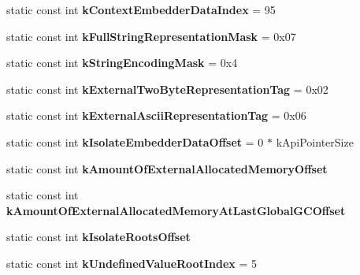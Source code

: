 \begin{DoxyCompactItemize}
\item 
\hypertarget{classv8_1_1internal_1_1_internals_afb65846499ec5f68172e4b2e8301a493}{}static const int {\bfseries k\+Context\+Embedder\+Data\+Index} = 95\label{classv8_1_1internal_1_1_internals_afb65846499ec5f68172e4b2e8301a493}

\item 
\hypertarget{classv8_1_1internal_1_1_internals_a5c39a86b30463928ea719def66916507}{}static const int {\bfseries k\+Full\+String\+Representation\+Mask} = 0x07\label{classv8_1_1internal_1_1_internals_a5c39a86b30463928ea719def66916507}

\item 
\hypertarget{classv8_1_1internal_1_1_internals_a1927ac3def13a57e03025e62ca46d1c5}{}static const int {\bfseries k\+String\+Encoding\+Mask} = 0x4\label{classv8_1_1internal_1_1_internals_a1927ac3def13a57e03025e62ca46d1c5}

\item 
\hypertarget{classv8_1_1internal_1_1_internals_a73faf917416d2519b65c7255e77a74ce}{}static const int {\bfseries k\+External\+Two\+Byte\+Representation\+Tag} = 0x02\label{classv8_1_1internal_1_1_internals_a73faf917416d2519b65c7255e77a74ce}

\item 
\hypertarget{classv8_1_1internal_1_1_internals_adea2f5a76d07821f7fa885a8dcda0eec}{}static const int {\bfseries k\+External\+Ascii\+Representation\+Tag} = 0x06\label{classv8_1_1internal_1_1_internals_adea2f5a76d07821f7fa885a8dcda0eec}

\item 
\hypertarget{classv8_1_1internal_1_1_internals_ad722bf4760df09958cd1062db4a5524c}{}static const int {\bfseries k\+Isolate\+Embedder\+Data\+Offset} = 0 $\ast$ k\+Api\+Pointer\+Size\label{classv8_1_1internal_1_1_internals_ad722bf4760df09958cd1062db4a5524c}

\item 
static const int {\bfseries k\+Amount\+Of\+External\+Allocated\+Memory\+Offset}
\item 
static const int {\bfseries k\+Amount\+Of\+External\+Allocated\+Memory\+At\+Last\+Global\+G\+C\+Offset}
\item 
static const int {\bfseries k\+Isolate\+Roots\+Offset}
\item 
\hypertarget{classv8_1_1internal_1_1_internals_a7281ff0eafed559e64613465b1a03296}{}static const int {\bfseries k\+Undefined\+Value\+Root\+Index} = 5\label{classv8_1_1internal_1_1_internals_a7281ff0eafed559e64613465b1a03296}


\end{DoxyCompactItemize}
